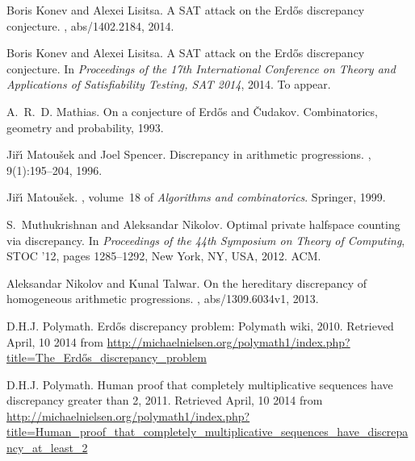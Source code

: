 \documentclass{article} \usepackage[utf8]{inputenc}
\begin{document}
\begin{thebibliography}{}
Boris Konev and Alexei Lisitsa.
\newblock A SAT attack on the {Erd\H{o}s} discrepancy conjecture.
, abs/1402.2184, 2014.

Boris Konev and Alexei Lisitsa.
\newblock A SAT attack on the {Erd\H{o}s} discrepancy conjecture.
\newblock In {\em Proceedings of the 17th International Conference on Theory
  and Applications of Satisfiability Testing, SAT 2014}, 2014.
\newblock To appear.

A.~R.~D. Mathias.
\newblock On a conjecture of {E}rd{\H{o}}s and {{\v{C}}}udakov.
\newblock Combinatorics, geometry and probability, 1993.

Ji\v{r}\'{\i} Matou\v{s}ek and Joel Spencer.
\newblock Discrepancy in arithmetic progressions.
, 9(1):195--204,
  1996.

Ji\v{r}\'{\i} Matou\v{s}ek.
, volume~18 of {\em
  Algorithms and combinatorics}.
\newblock Springer, 1999.

S.~Muthukrishnan and Aleksandar Nikolov.
\newblock Optimal private halfspace counting via discrepancy.
\newblock In {\em Proceedings of the 44th Symposium on Theory of Computing},
  STOC '12, pages 1285--1292, New York, NY, USA, 2012. ACM.

Aleksandar Nikolov and Kunal Talwar.
\newblock On the hereditary discrepancy of homogeneous arithmetic progressions.
, abs/1309.6034v1, 2013.

D.H.J. Polymath.
\newblock Erd{\H{o}}s discrepancy problem: {P}olymath wiki, 2010.
\newblock
Retrieved April, 10 2014 from
  \url{http://michaelnielsen.org/polymath1/index.php?title=The_Erdős_discrepancy_problem}

D.H.J. Polymath.
\newblock Human proof that completely multiplicative sequences have discrepancy
  greater than 2, 2011.
\newblock
Retrieved April, 10 2014 from
  \url{http://michaelnielsen.org/polymath1/index.php?title=Human_proof_that_completely_multiplicative_sequences_have_discrepancy_at_least_2}


\end{thebibliography}
\end{document}
